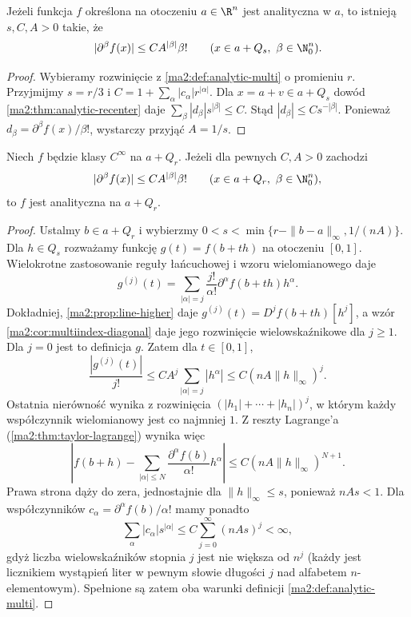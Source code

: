 \begin{wniosek}
\label{ma2:cor:analytic-local-derivative-bound}
Jeżeli funkcja $f$ określona na otoczeniu
$a\in\R^n$ jest analityczna w $a$,
to istnieją $s,C,A>0$ takie, że
\[
 |\partial^\beta f(x)|\le C A^{|\beta|}\beta!
 \qquad(x\in a+Q_s,\ \beta\in\N_0^n).
\]
\end{wniosek}
\begin{proof}
Wybieramy rozwinięcie z
\ref{ma2:def:analytic-multi} o promieniu $r$.
Przyjmijmy $s=r/3$ i
$C=1+\sum_\alpha|c_\alpha|r^{|\alpha|}$.
Dla $x=a+v\in a+Q_s$ dowód
\ref{ma2:thm:analytic-recenter} daje
$\sum_\beta |d_\beta|s^{|\beta|}\le C$.
Stąd $|d_\beta|\le Cs^{-|\beta|}$.
Ponieważ $d_\beta=\partial^\beta f(x)/\beta!$,
wystarczy przyjąć $A=1/s$.
\end{proof}

\begin{twierdzenie}
\label{ma2:thm:analytic-multi-bound}
Niech $f$ będzie klasy $C^\infty$ na $a+Q_r$.
Jeżeli dla pewnych $C,A>0$ zachodzi
\[
 |\partial^\beta f(x)|\le C A^{|\beta|}\beta!
 \qquad(x\in a+Q_r,\ \beta\in\N_0^n),
\]
to $f$ jest analityczna na $a+Q_r$.
\end{twierdzenie}
\begin{proof}
Ustalmy $b\in a+Q_r$ i wybierzmy
$0<s<\min\{r-\|b-a\|_\infty,1/(nA)\}$.
Dla $h\in Q_s$ rozważamy funkcję
$g(t)=f(b+th)$ na otoczeniu $[0,1]$.
Wielokrotne zastosowanie reguły łańcuchowej
i wzoru wielomianowego daje
\[
 g^{(j)}(t)=\sum_{|\alpha|=j}
 \frac{j!}{\alpha!}\partial^\alpha f(b+th)h^\alpha.
\]
Dokładniej, \ref{ma2:prop:line-higher} daje
$g^{(j)}(t)=D^jf(b+th)[h^j]$, a wzór
\ref{ma2:cor:multiindex-diagonal} daje
jego rozwinięcie wielowskaźnikowe dla $j\ge1$.
Dla $j=0$ jest to definicja $g$.
Zatem dla $t\in[0,1]$,
\[
 \frac{|g^{(j)}(t)|}{j!}
 \le C A^j\sum_{|\alpha|=j}|h^\alpha|
 \le C(nA\|h\|_\infty)^j.
\]
Ostatnia nierówność wynika z rozwinięcia
$(|h_1|+\cdots+|h_n|)^j$, w którym każdy
współczynnik wielomianowy jest co najmniej $1$.
Z reszty Lagrange'a
(\ref{ma2:thm:taylor-lagrange}) wynika więc
\[
 \left|f(b+h)-\sum_{|\alpha|\le N}
 \frac{\partial^\alpha f(b)}{\alpha!}h^\alpha\right|
 \le C(nA\|h\|_\infty)^{N+1}.
\]
Prawa strona dąży do zera, jednostajnie dla
$\|h\|_\infty\le s$, ponieważ $nAs<1$.
Dla współczynników
$c_\alpha=\partial^\alpha f(b)/\alpha!$
mamy ponadto
\[
 \sum_\alpha |c_\alpha|s^{|\alpha|}
 \le C\sum_{j=0}^\infty (nAs)^j<\infty,
\]
gdyż liczba wielowskaźników stopnia $j$
jest nie większa od $n^j$ (każdy jest
licznikiem wystąpień liter w pewnym słowie
długości $j$ nad alfabetem $n$-elementowym).
Spełnione są zatem oba warunki definicji
\ref{ma2:def:analytic-multi}.
\end{proof}

